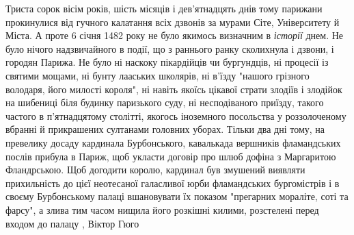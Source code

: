 Триста сорок вісім років, шість місяців і дев'ятнадцять днів тому парижани
прокинулися від гучного калатання всіх дзвонів за мурами Сіте,
Університету й Міста.  А проте 6 січня 1482 року не було якимось визначним в
\emph{історії} днем. Не було нічого надзвичайного в події, що з раннього ранку
сколихнула і дзвони, і городян Парижа. Не було ні наскоку пікардійців чи
бургундців, ні процесії із святими мощами, ні бунту лааських школярів, ні
в'їзду "нашого грізного володаря, його милості короля", ні навіть якоїсь
цікавої страти злодіїв і злодійок на шибениці біля будинку паризького суду, ні
несподіваного приїзду, такого частого в п'ятнадцятому столітті, якогось
іноземного посольства у роззолоченому вбранні й прикрашених султанами головних
уборах. Тільки два дні тому, на превелику досаду кардинала Бурбонського,
кавалькада вершників фламандських послів прибула в Париж, щоб укласти договір
про шлюб дофіна з Маргаритою Фландрською. Щоб догодити королю, кардинал був
змушений виявляти прихильність до цієї неотесаної галасливої юрби фламандських
бургомістрів і в своєму Бурбонському палаці вшановувати їх показом "прегарних
мораліте, соті та фарсу", а злива тим часом нищила його розкішні килими,
розстелені перед входом до палацу
, Віктор Гюго
